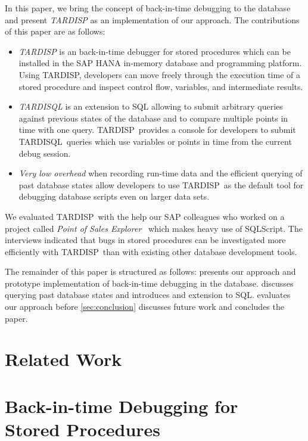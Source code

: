 \documentclass[english]{sig-alternate-05-2015}
\newcommand{\tool}{TARDISP}
\newcommand{\SQLextension}{TARDISQL}
\begin{document}
In this paper, we bring the concept of back-in-time debugging to the database and present \emph{\tool} as an implementation of our approach.
The contributions of this paper are as follows:
\begin{itemize}
	\item \emph{\tool} is an back-in-time debugger for stored procedures which can be installed in the SAP HANA in-memory database and programming platform.
		Using \tool, developers can move freely through the execution time of a stored procedure and inspect control flow, variables, and intermediate results.
	
	\item \emph{\SQLextension} is an extension to SQL allowing to submit arbitrary queries against previous states of the database 
		and to compare multiple points in time with one query.
		\tool\, provides a console for developers to submit \SQLextension\, queries which use variables or points in time from the current debug session.

	\item \emph{Very low overhead} when recording run-time data and the efficient querying of past database states allow developers to use \tool\, as the default tool for debugging database scripts even on larger data sets.
	
\end{itemize}

We evaluated \tool\, with the help our SAP colleagues who worked on a project called \emph{Point of Sales Explorer}~\cite{plattner2015memory} which makes heavy use of SQLScript. 
The interviews indicated that bugs in stored procedures can be investigated more efficiently with \tool\, than with existing other database development tools.

The remainder of this paper is structured as follows:
 presents our approach and prototype implementation of back-in-time debugging in the database.
 discusses querying past database states and introduces and extension to SQL.
 evaluates our approach before \cref{sec:conclusion} discusses future work and concludes the paper.

\section{Related Work}

\section{Back-in-time Debugging for\\ Stored Procedures}
\label{sec:prototype}
\end{document}
